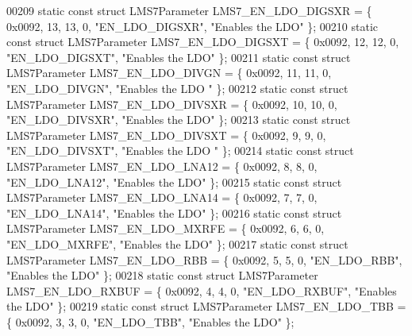 \begin{DoxyCode}
00209 \textcolor{keyword}{static} \textcolor{keyword}{const} \textcolor{keyword}{struct }LMS7Parameter LMS7_EN_LDO_DIGSXR = \{ 0x0092, 13, 13, 0, \textcolor{stringliteral}{"EN\_LDO\_DIGSXR"}, \textcolor{stringliteral}{"Enables the
       LDO"} \};
00210 \textcolor{keyword}{static} \textcolor{keyword}{const} \textcolor{keyword}{struct }LMS7Parameter LMS7_EN_LDO_DIGSXT = \{ 0x0092, 12, 12, 0, \textcolor{stringliteral}{"EN\_LDO\_DIGSXT"}, \textcolor{stringliteral}{"Enables the
       LDO"} \};
00211 \textcolor{keyword}{static} \textcolor{keyword}{const} \textcolor{keyword}{struct }LMS7Parameter LMS7_EN_LDO_DIVGN = \{ 0x0092, 11, 11, 0, \textcolor{stringliteral}{"EN\_LDO\_DIVGN"}, \textcolor{stringliteral}{"Enables the LDO
      "} \};
00212 \textcolor{keyword}{static} \textcolor{keyword}{const} \textcolor{keyword}{struct }LMS7Parameter LMS7_EN_LDO_DIVSXR = \{ 0x0092, 10, 10, 0, \textcolor{stringliteral}{"EN\_LDO\_DIVSXR"}, \textcolor{stringliteral}{"Enables the
       LDO"} \};
00213 \textcolor{keyword}{static} \textcolor{keyword}{const} \textcolor{keyword}{struct }LMS7Parameter LMS7_EN_LDO_DIVSXT = \{ 0x0092, 9, 9, 0, \textcolor{stringliteral}{"EN\_LDO\_DIVSXT"}, \textcolor{stringliteral}{"Enables the LDO
      "} \};
00214 \textcolor{keyword}{static} \textcolor{keyword}{const} \textcolor{keyword}{struct }LMS7Parameter LMS7_EN_LDO_LNA12 = \{ 0x0092, 8, 8, 0, \textcolor{stringliteral}{"EN\_LDO\_LNA12"}, \textcolor{stringliteral}{"Enables the LDO"} 
      \};
00215 \textcolor{keyword}{static} \textcolor{keyword}{const} \textcolor{keyword}{struct }LMS7Parameter LMS7_EN_LDO_LNA14 = \{ 0x0092, 7, 7, 0, \textcolor{stringliteral}{"EN\_LDO\_LNA14"}, \textcolor{stringliteral}{"Enables the LDO"} 
      \};
00216 \textcolor{keyword}{static} \textcolor{keyword}{const} \textcolor{keyword}{struct }LMS7Parameter LMS7_EN_LDO_MXRFE = \{ 0x0092, 6, 6, 0, \textcolor{stringliteral}{"EN\_LDO\_MXRFE"}, \textcolor{stringliteral}{"Enables the LDO"} 
      \};
00217 \textcolor{keyword}{static} \textcolor{keyword}{const} \textcolor{keyword}{struct }LMS7Parameter LMS7_EN_LDO_RBB = \{ 0x0092, 5, 5, 0, \textcolor{stringliteral}{"EN\_LDO\_RBB"}, \textcolor{stringliteral}{"Enables the LDO"} \};
00218 \textcolor{keyword}{static} \textcolor{keyword}{const} \textcolor{keyword}{struct }LMS7Parameter LMS7_EN_LDO_RXBUF = \{ 0x0092, 4, 4, 0, \textcolor{stringliteral}{"EN\_LDO\_RXBUF"}, \textcolor{stringliteral}{"Enables the LDO"} 
      \};
00219 \textcolor{keyword}{static} \textcolor{keyword}{const} \textcolor{keyword}{struct }LMS7Parameter LMS7_EN_LDO_TBB = \{ 0x0092, 3, 3, 0, \textcolor{stringliteral}{"EN\_LDO\_TBB"}, \textcolor{stringliteral}{"Enables the LDO"} \};

\end{DoxyCode}

